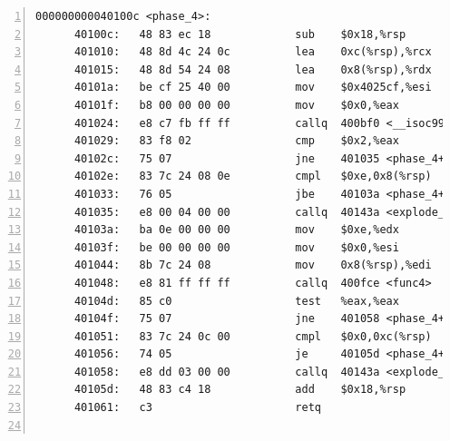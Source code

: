 \documentclass{article}
\begin{document}
\begin{lstlisting}[title = bomb的反汇编代码及部分注释, xleftmargin = 2em,xrightmargin = 2em, aboveskip = 1em, numbers = left, basicstyle=\scriptsize\ttfamily, numberstyle=\scriptsize]
    000000000040100c <phase_4>:
      40100c:	48 83 ec 18          	sub    $0x18,%rsp					; %rsp -= 0x18;
      401010:	48 8d 4c 24 0c       	lea    0xc(%rsp),%rcx				; %rcx = %rsp + 0xc;
      401015:	48 8d 54 24 08       	lea    0x8(%rsp),%rdx				; %rdx = %rsp + 0x8;
      40101a:	be cf 25 40 00       	mov    $0x4025cf,%esi				; %esi = 0x4025cf;
      40101f:	b8 00 00 00 00       	mov    $0x0,%eax					; %eax = 0;
      401024:	e8 c7 fb ff ff       	callq  400bf0 <__isoc99_sscanf@plt>	; sscanf(...)
      401029:	83 f8 02             	cmp    $0x2,%eax					; if (%eax != 2)
      40102c:	75 07                	jne    401035 <phase_4+0x29>		;	  goto #456;
      40102e:	83 7c 24 08 0e       	cmpl   $0xe,0x8(%rsp)				; if (M[%rsp + 0x8] <= 0xe)
      401033:	76 05                	jbe    40103a <phase_4+0x2e>		;	  goto #457;
      401035:	e8 00 04 00 00       	callq  40143a <explode_bomb>		; explode_bomb(...);
      40103a:	ba 0e 00 00 00       	mov    $0xe,%edx					; %edx = 0xe;
      40103f:	be 00 00 00 00       	mov    $0x0,%esi					; %rsi = 0;
      401044:	8b 7c 24 08          	mov    0x8(%rsp),%edi				; %edi = M[%rsp + 0x8];
      401048:	e8 81 ff ff ff       	callq  400fce <func4>				; func4(%edi, %esi, %edx);
      40104d:	85 c0                	test   %eax,%eax					; if (%eax != 0)
      40104f:	75 07                	jne    401058 <phase_4+0x4c>		;	  goto #465;
      401051:	83 7c 24 0c 00       	cmpl   $0x0,0xc(%rsp)				; if (M[%rsp + 0xc] == 0)
      401056:	74 05                	je     40105d <phase_4+0x51>		;	  goto #466;
      401058:	e8 dd 03 00 00       	callq  40143a <explode_bomb>		; explode_bomb(...);
      40105d:	48 83 c4 18          	add    $0x18,%rsp					; %rsp += 0x18;
      401061:	c3                   	retq								; return;
    

\end{lstlisting}
\end{document}
